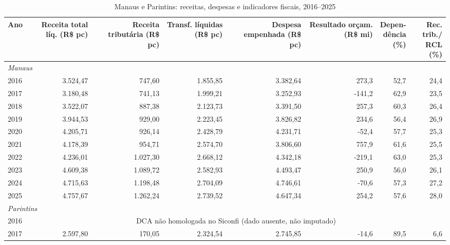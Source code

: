 \begin{table}[htbp]
\centering
\caption{Manaus e Parintins: receitas, despesas e indicadores fiscais, 2016--2025}
\label{tab:focos}
\footnotesize
\begin{tabular}{lrrrrrrr}
\toprule
Ano & \makecell{Receita\\total líq.\\(R\$ pc)} & \makecell{Receita\\tributária\\(R\$ pc)} & \makecell{Transf.\\líquidas\\(R\$ pc)} & \makecell{Despesa\\empenhada\\(R\$ pc)} & \makecell{Resultado\\orçam.\\(R\$ mi)} & \makecell{Depen-\\dência\\(\%)} & \makecell{Rec. trib./\\RCL\\(\%)}\\
\midrule
\multicolumn{8}{l}{\textit{Manaus}}\\
2016 & 3.524,47 & 747,60 & 1.855,85 & 3.382,64 & 273,3 & 52,7 & 24,4\\
2017 & 3.180,48 & 741,13 & 1.999,21 & 3.252,93 & -141,2 & 62,9 & 23,5\\
2018 & 3.522,07 & 887,38 & 2.123,73 & 3.391,50 & 257,3 & 60,3 & 26,4\\
2019 & 3.944,53 & 929,00 & 2.223,45 & 3.826,82 & 234,6 & 56,4 & 26,9\\
2020 & 4.205,71 & 926,14 & 2.428,79 & 4.231,71 & -52,4 & 57,7 & 25,3\\
2021 & 4.178,39 & 954,71 & 2.574,70 & 3.806,60 & 757,9 & 61,6 & 25,5\\
2022 & 4.236,01 & 1.027,30 & 2.668,12 & 4.342,18 & -219,1 & 63,0 & 25,3\\
2023 & 4.609,38 & 1.089,72 & 2.582,93 & 4.493,47 & 250,9 & 56,0 & 26,1\\
2024 & 4.715,63 & 1.198,48 & 2.704,09 & 4.746,61 & -70,6 & 57,3 & 27,2\\
2025 & 4.757,67 & 1.262,24 & 2.739,52 & 4.647,34 & 254,2 & 57,6 & 28,0\\
\multicolumn{8}{l}{\textit{Parintins}}\\
2016 & \multicolumn{7}{c}{DCA não homologada no Siconfi (dado ausente, não imputado)}\\
2017 & 2.597,80 & 170,05 & 2.324,54 & 2.745,85 & -14,6 & 89,5 & 6,6\\

\end{tabular}
\end{table}
